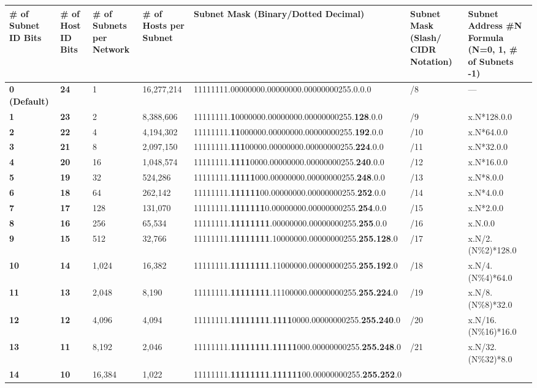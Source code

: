 \begin{longtable}[]{@{}lllllll@{}}
\toprule
\# of Subnet ID Bits & \# of Host ID Bits & \# of Subnets per Network &
\# of Hosts per Subnet & Subnet Mask (Binary/Dotted Decimal) & Subnet
Mask (Slash/ CIDR Notation) & Subnet Address \#N Formula (N=0, 1, \# of
Subnets -1)\tabularnewline
\midrule
\endhead
{\textbf{0 (Default)}} & {\textbf{24}} & 1 & 16,277,214 &
11111111.00000000.00000000.00000000255.0.0.0 & /8 & ---\tabularnewline
{\textbf{1}} & {\textbf{23}} & 2 & 8,388,606 &
11111111.{\textbf{1}}0000000.00000000.00000000255.{\textbf{128}}.0.0 &
/9 & x.N*128.0.0\tabularnewline
{\textbf{2}} & {\textbf{22}} & 4 & 4,194,302 &
11111111.{\textbf{11}}000000.00000000.00000000255.{\textbf{192}}.0.0 &
/10 & x.N*64.0.0\tabularnewline
{\textbf{3}} & {\textbf{21}} & 8 & 2,097,150 &
11111111.{\textbf{111}}00000.00000000.00000000255.{\textbf{224}}.0.0 &
/11 & x.N*32.0.0\tabularnewline
{\textbf{4}} & {\textbf{20}} & 16 & 1,048,574 &
11111111.{\textbf{1111}}0000.00000000.00000000255.{\textbf{240}}.0.0 &
/12 & x.N*16.0.0\tabularnewline
{\textbf{5}} & {\textbf{19}} & 32 & 524,286 &
11111111.{\textbf{11111}}000.00000000.00000000255.{\textbf{248}}.0.0 &
/13 & x.N*8.0.0\tabularnewline
{\textbf{6}} & {\textbf{18}} & 64 & 262,142 &
11111111.{\textbf{111111}}00.00000000.00000000255.{\textbf{252}}.0.0 &
/14 & x.N*4.0.0\tabularnewline
{\textbf{7}} & {\textbf{17}} & 128 & 131,070 &
11111111.{\textbf{1111111}}0.00000000.00000000255.{\textbf{254}}.0.0 &
/15 & x.N*2.0.0\tabularnewline
{\textbf{8}} & {\textbf{16}} & 256 & 65,534 &
11111111.{\textbf{11111111}}.00000000.00000000255.{\textbf{255}}.0.0 &
/16 & x.N.0.0\tabularnewline
{\textbf{9}} & {\textbf{15}} & 512 & 32,766 &
11111111.{\textbf{11111111}}.10000000.00000000255.{\textbf{255.128}}.0 &
/17 & x.N/2.(N\%2)*128.0\tabularnewline
{\textbf{10}} & {\textbf{14}} & 1,024 & 16,382 &
11111111.{\textbf{11111111}}.11000000.00000000255.{\textbf{255.192}}.0 &
/18 & x.N/4.(N\%4)*64.0\tabularnewline
{\textbf{11}} & {\textbf{13}} & 2,048 & 8,190 &
11111111.{\textbf{11111111}}.11100000.00000000255.{\textbf{255.224}}.0 &
/19 & x.N/8.(N\%8)*32.0\tabularnewline
{\textbf{12}} & {\textbf{12}} & 4,096 & 4,094 &
11111111.{\textbf{11111111}}.{\textbf{1111}}0000.00000000255.{\textbf{255.240}}.0
& /20 & x.N/16.(N\%16)*16.0\tabularnewline
{\textbf{13}} & {\textbf{11}} & 8,192 & 2,046 &
11111111.{\textbf{11111111}}.{\textbf{11111}}000.00000000255.{\textbf{255.248}}.0
& /21 & x.N/32.(N\%32)*8.0\tabularnewline
{\textbf{14}} & {\textbf{10}} & 16,384 & 1,022 &
11111111.{\textbf{11111111}}.{\textbf{111111}}00.00000000255.{\textbf{255.252}}.0

\end{longtable}

